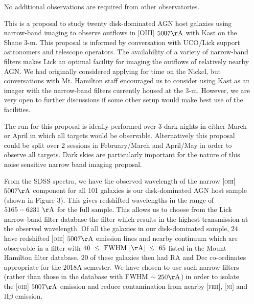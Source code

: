 \documentclass[12pt]{article}
\begin{document}
\vspace{0.25em}
\newpage


\vspace{0.25em}

\noindent No additional observations are required from other observatories.

\vspace{0.25em}


\vspace{0.25em}
This is a proposal to study twenty disk-dominated AGN host galaxies using narrow-band imaging to observe outflows in \textsc{[OIII]} $5007\rm{\AA}$ with Kast on the Shane 3-m. This proposal is informed by conversation with UCO/Lick support astronomers and telescope operators. The availability of a variety of narrow-band filters makes Lick an optimal facility for imaging the outflows of relatively nearby AGN. We had originally considered applying for time on the Nickel, but conversations with Mt. Hamilton staff encouraged us to consider using Kast as an imager with the narrow-band filters currently housed at the 3-m. However, we are very open to further discussions if some other setup would make best use of the facilities.
\vspace{0.25em}

The run for this proposal is ideally performed over 3 dark nights in either March or April in which all targets would be observable. Alternatively this proposal could be split over 2 sessions in February/March and April/May in order to observe all targets. Dark skies are particularly important for the nature of this noise sensitive narrow band imaging proposal. 

\vspace{0.25em}

From the SDSS spectra, we have the observed  wavelength of the narrow \textsc{[oiii]} $5007\rm{\AA}$ component for all 101 galaxies is our disk-dominated AGN host sample (shown in Figure 3). This gives redshifted wavelengths in the range of $5165-6231~\rm{\AA}$ for the full sample. This allows us to choose from the Lick narrow-band filter database the filter which results in the highest transmission at the observed wavelength. Of all the galaxies in our disk-dominated sample, 24 have redshifted \textsc{[oiii]} $5007\rm{\AA}$ emission lines and nearby continuum which are observable in a filter with $40~\leq~\rm{FWHM}~[\rm{\AA}]~\leq~65$ listed in the Mount Hamilton filter database. $20$ of these galaxies then had RA and Dec co-ordinates appropriate for the 2018A semester. We have chosen to use such narrow filters (rather than those in the database with FWHM $\sim250\rm{\AA}$) in order to isolate the \textsc{[oiii]} $5007\rm{\AA}$ emission and reduce contamination from nearby \textsc{[feii]}, \textsc{[ni]} and H$\beta$ emission. 
\vspace{0.25em}
\end{document}
